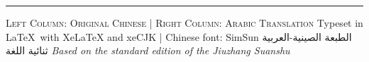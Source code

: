 \documentclass[11pt,a4paper]{article}
\begin{document}
\vspace{1cm}

\begin{center}
\rule{0.3\textwidth}{0.4pt}
\vspace{0.5cm}
{\small\textsc{Left Column: Original Chinese \quad | \quad Right Column: Arabic Translation}}
\vspace{0.3cm}
{\small Typeset in \LaTeX\ with XeLaTeX and xeCJK \quad | \quad Chinese font: SimSun}
\vspace{0.3cm}
{\small\arabicfont\beginR الطبعة الصينية-العربية ثنائية اللغة\endR}
\vspace{0.3cm}
{\small\textit{Based on the standard edition of the Jiuzhang Suanshu}}
\end{center}
\end{document}

